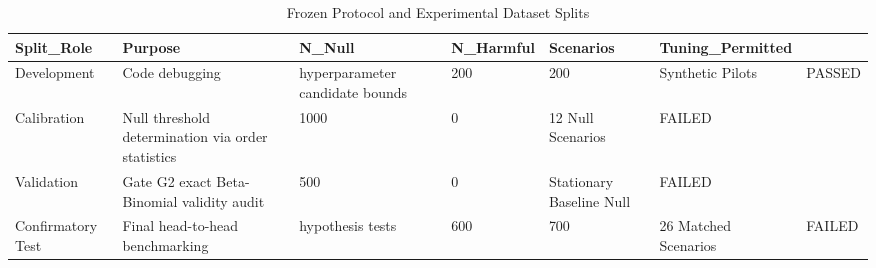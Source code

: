 \begin{table}[htbp]
\centering
\caption{Frozen Protocol and Experimental Dataset Splits}
\label{tab:table_T2_code_integrity}
\begin{tabular}{llllll}
\hline
Split\_Role & Purpose & N\_Null & N\_Harmful & Scenarios & Tuning\_Permitted \\
\hline
Development & Code debugging & hyperparameter candidate bounds & 200 & 200 & Synthetic Pilots & PASSED \\
Calibration & Null threshold determination via order statistics & 1000 & 0 & 12 Null Scenarios & FAILED \\
Validation & Gate G2 exact Beta-Binomial validity audit & 500 & 0 & Stationary Baseline Null & FAILED \\
Confirmatory Test & Final head-to-head benchmarking & hypothesis tests & 600 & 700 & 26 Matched Scenarios & FAILED \\
\hline
\end{tabular}
\end{table}
